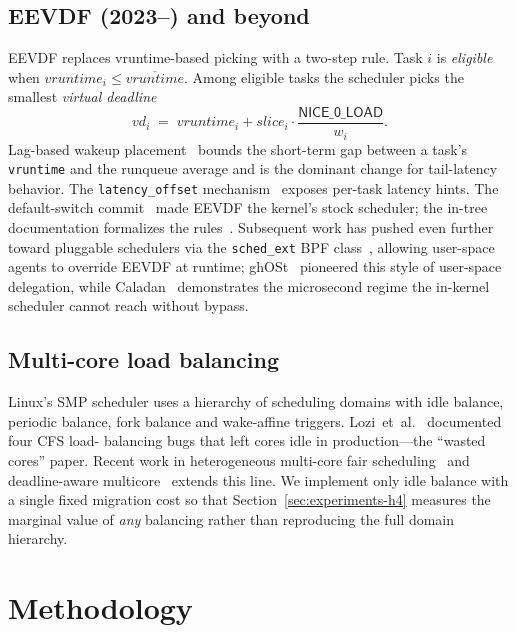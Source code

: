 \documentclass[conference]{IEEEtran}
\begin{document}
\subsection{EEVDF (2023--) and beyond}

EEVDF replaces vruntime-based picking with a two-step rule. Task $i$
is \emph{eligible} when $\mathit{vruntime}_i \le
\overline{\mathit{vruntime}}$. Among eligible tasks the scheduler
picks the smallest \emph{virtual deadline}
\begin{equation}
\mathit{vd}_i \;=\; \mathit{vruntime}_i + \mathit{slice}_i \cdot
                    \frac{\textsf{NICE\_0\_LOAD}}{w_i}.
\label{eq:vd}
\end{equation}
Lag-based wakeup placement~\cite{zijlstra_eevdf_lag_2023} bounds the
short-term gap between a task's \texttt{vruntime} and the runqueue
average and is the dominant change for tail-latency behavior. The
\texttt{latency\_offset}
mechanism~\cite{zijlstra_eevdf_latency_2023} exposes per-task latency
hints. The default-switch commit~\cite{zijlstra_eevdf_default_2023}
made EEVDF the kernel's stock scheduler; the in-tree documentation
formalizes the rules~\cite{linux_eevdf_doc_2024}. Subsequent work has
pushed even further toward pluggable schedulers via the
\texttt{sched\_ext} BPF
class~\cite{linux_schedext_doc_2024,corbet_schedext_2024,
corbet_schedext_lpc_2024}, allowing user-space agents to override
EEVDF at runtime; ghOSt~\cite{humphries2021ghost} pioneered this style
of user-space delegation, while
Caladan~\cite{fried2020caladan} demonstrates the microsecond regime
the in-kernel scheduler cannot reach without bypass.

\subsection{Multi-core load balancing}

Linux's SMP scheduler uses a hierarchy of scheduling domains with
idle balance, periodic balance, fork balance and wake-affine
triggers. Lozi~et~al.~\cite{lozi2016} documented four CFS load-
balancing bugs that left cores idle in production---the ``wasted
cores'' paper. Recent work in heterogeneous multi-core fair
scheduling~\cite{choi2022energy} and deadline-aware
multicore~\cite{saha2023delicious} extends this line. We implement
only idle balance with a single fixed migration cost so that
Section~\ref{sec:experiments-h4} measures the marginal value of
\emph{any} balancing rather than reproducing the full domain
hierarchy.

\section{Methodology}
\label{sec:methodology}
\end{document}
